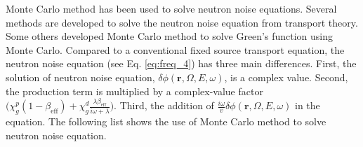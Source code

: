 Monte Carlo method has been used to solve neutron noise equations. Several methods are developed to solve the neutron noise equation from transport theory. Some others developed Monte Carlo method to solve Green’s function using Monte Carlo. Compared to a conventional fixed source transport equation, the neutron noise equation (see Eq. \ref{eq:freq_4}) has three main differences. First, the solution of neutron noise equation, $\delta \phi(\textbf{r},\Omega, E, \omega)$, is a complex value. Second, the production term is multiplied by a complex-value factor $\biggl( \chi^p_g (1-\beta_{\text{eff}}) + \chi^d_g \frac{\lambda \beta_{\text{eff}}}{i \omega + \lambda} \biggr)$. Third, the addition of $\frac{i \omega}{v} \delta \phi(\textbf{r},\Omega, E, \omega)$ in the equation. The following list shows the use of Monte Carlo method to solve neutron noise equation.

